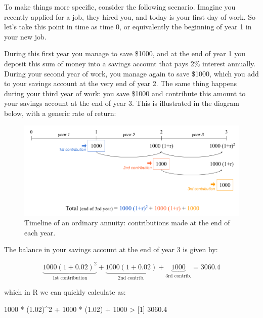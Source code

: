 \documentclass[
]{book}
\newenvironment{Shaded}{\begin{snugshade}}{\end{snugshade}}
\newcommand{\DecValTok}[1]{\textcolor[rgb]{0.00,0.00,0.81}{#1}}
\newcommand{\FloatTok}[1]{\textcolor[rgb]{0.00,0.00,0.81}{#1}}
\newcommand{\NormalTok}[1]{#1}
\newcommand{\SpecialCharTok}[1]{\textcolor[rgb]{0.00,0.00,0.00}{#1}}
\begin{document}
To make things more specific, consider the following scenario. Imagine you
recently applied for a job, they hired you, and today is your first day of work.
So let's take this point in time as time 0, or equivalently the beginning of
year 1 in your new job.

During this first year you manage to save \$1000, and at the end of year 1 you
deposit this sum of money into a savings account that pays 2\% interest annually.
During your second year of work, you manage again to save \$1000, which you
add to your savings account at the very end of year 2. The same thing happens
during your third year of work: you save \$1000 and contribute this amount to
your savings account at the end of year 3. This is illustrated in the
diagram below, with a generic rate of return:

\begin{figure}

{\centering \includegraphics[width=0.95\linewidth]{images/conditionals/timeline-ord-annuity} 

}

\caption{Timeline of an ordinary annuity: contributions made at the end of each year.}\label{fig:unnamed-chunk-259}
\end{figure}

The balance in your savings account at the end of year 3 is given by:

\[
\underbrace{1000 (1 + 0.02)^2}_{\text{1st contribution}} + \underbrace{1000 (1 + 0.02)}_{\text{2nd contrib.}} + \underbrace{1000}_{\text{3rd contrib.}} = 3060.4
\]

which in R we can quickly calculate as:

\begin{Shaded}
\begin{Highlighting}[]
\DecValTok{1000} \SpecialCharTok{*}\NormalTok{ (}\FloatTok{1.02}\NormalTok{)}\SpecialCharTok{\^{}}\DecValTok{2} \SpecialCharTok{+} \DecValTok{1000} \SpecialCharTok{*}\NormalTok{ (}\FloatTok{1.02}\NormalTok{) }\SpecialCharTok{+} \DecValTok{1000}
\SpecialCharTok{\textgreater{}}\NormalTok{ [}\DecValTok{1}\NormalTok{] }\FloatTok{3060.4}
\end{Highlighting}
\end{Shaded}
\end{document}
